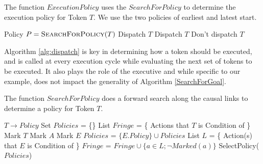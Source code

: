 
\begin{algorithm}[!h]
  \caption{\small The function $ExecutionPolicy$ uses the
    $SearchForPolicy$ to determine the execution policy for Token
    $T$. We use the two policies of earliest and latest start.}
  \label{alg:dispatch}
\label{ExecutionPolicy}
\begin{algorithmic}
\small 
{}
\State Policy $P = \textsc{SearchForPolicy}( T )$
	\State \Return Dispatch $T$
	\State \Return Dispatch $T$
\Else
	\State \Return Don't dispatch $T$
\EndIf
\EndFunction
\end{algorithmic}
\end{algorithm}

Algorithm \ref{alg:dispatch} is key in determining how a token should
be executed, and is called at every execution cycle while evaluating
the next set of tokens to be executed. It also plays the role of the
executive and while specific to our example, does not impact the
generality of Algorithm \ref{SearchForGoal}.


\begin{algorithm} [htb]
  \caption{\small The function $SearchForPolicy$ does a forward search
    along the causal links to determine a policy for Token $T$.}
  \label{SearchForGoal}
\begin{algorithmic}
  \small
  \State \Return $T \to Policy$
  \Else 
  \State Set $Policies$ = \{\}
  \State List $Fringe$ = \{ Actions that $T$ is Condition of \}
  \State Mark $T$
  \State Mark $A$
  \State Mark $E$
    \State $Policies$ =  $\{ E.Policy \} \cup Policies$
  \EndIf
  \State List $L$ = \{ Action(s) that $E$ is Condition of \}
  \State $Fringe$ = $Fringe \cup \{a \in L; \neg Marked(a) \}$ 
  \EndFor
  \EndFor
  \State \Return SelectPolicy($Policies$)
  \EndIf
\EndFunction
\end{algorithmic}
\end{algorithm}


